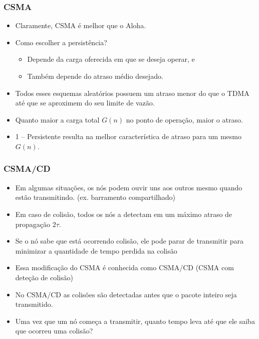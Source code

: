 \begin{frame}
	\frametitle{CSMA}
	
	\begin{itemize}
	    \item Claramente, CSMA é melhor que o Aloha.
	    \item Como escolher a persistência?
	    \begin{itemize}
		\item Depende da carga oferecida em que se deseja operar, e 
		\item Também depende do atraso médio desejado.
	    \end{itemize}
	    \item Todos esses esquemas aleatórios possuem um atraso menor do que o TDMA até que se aproximem do seu limite de vazão.
	    \item Quanto maior a carga total $G(n)$ no ponto de operação, maior o atraso.
	    \item 1 – Persistente resulta na melhor característica de atraso para um mesmo $G(n)$.
	\end{itemize}
	
\end{frame}

\begin{frame}
	\frametitle{CSMA/CD}
	
	\begin{itemize}
	    \item Em algumas situações, os nós podem ouvir uns aos outros mesmo quando estão transmitindo. (ex. barramento compartilhado)
	    \item Em caso de colisão, todos os nós a detectam em um máximo atraso de propagação $2\tau$.
	    \item Se o nó sabe que está ocorrendo colisão, ele pode parar de transmitir para minimizar a quantidade de tempo perdida na colisão
	    \item Essa modificação do CSMA é conhecida como CSMA/CD (CSMA com deteção de colisão)
	    \item No CSMA/CD as colisões são detectadas antes que o pacote inteiro seja transmitido.
	    \item Uma vez que um nó começa a transmitir, quanto tempo leva até que ele saiba que ocorreu uma colisão?
	\end{itemize}
	
\end{frame}

